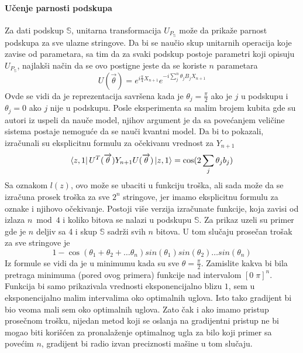 \documentclass[12pt, letterpaper, oneside]{article}
\begin{document}
\paragraph{Učenje parnosti podskupa}
Za dati podskup $\mathbb{S}$, unitarna transformacija $U_{P_\mathbb{S}}$ može da prikaže parnost podskupa za sve ulazne stringove.
Da bi se naučio skup unitarnih operacija koje zavise od parametara, sa tim da za svaki podskup postoje parametri koji opisuju $U_{P_\mathbb{S}}$,
najlakši način da se ovo postigne jeste da se koriste $n$ parametara
\[
    U(\overrightarrow{\theta}) = e^{i\frac{\pi}{4}X_{n+1}}e^{-i\sum_j^n \theta_jB_jX_{n+1}}
\]
Ovde se vidi da je reprezentacija savršena kada je $\theta_j = \frac{\pi}{2}$ ako je $j$ u podskupu i $\theta_j = 0$ ako $j$ nije u podskupu.
Posle eksperimenta sa malim brojem kubita gde su autori iz \cite{Classification_wit_QNN} uspeli da nauče model, njihov argument je da sa povećanjem veličine sistema postaje nemoguće da se nauči kvantni model.
Da bi to pokazali, izračunali su eksplicitnu formulu za očekivanu vrednost za $Y_{n+1}$
\[
    \bra{z,1}U^T(\overrightarrow{\theta})Y_{n+1}U(\overrightarrow{\theta})\Ket{z,1} = \cos(2\sum_j\theta_jb_j)
\]
Sa oznakom $l(z)$, ovo može se ubaciti u funkciju troška, ali sada može da se izračuna prosek
troška za sve $2^n$ stringove, jer imamo eksplicitnu formulu za oznake i njihovo očekivanje.
Postoji više verzija izračunate funkcije, koja zavisi od izlaza $n \bmod 4$ i koliko bitova se nalazi u podskupu $\mathbb{S}$.
Za prikaz uzeli su primer gde je $n$ deljiv sa 4 i skup $\mathbb{S}$ sadrži svih $n$ bitova.
U tom slučaju prosečan trošak za sve stringove je 
\[
    1 - \cos(\theta_1 + \theta_2 + \dots \theta_n)sin(\theta_1)sin(\theta_2) \dots sin(\theta_n)
\]
Iz formule se vidi da je u minimumu kada su sve $\theta=\frac{\pi}{2}$. Zamislite kakva bi bila pretraga minimuma (pored ovog primera) funkcije
nad intervalom $[0\;\pi]^n$. Funkcija bi samo prikazivala vrednosti eksponencijalno blizu $1$, sem u eksponencijalno malim intervalima oko optimalnih uglova.
Isto tako gradijent bi bio veoma mali sem oko optimalnih uglova. Zato čak i ako imamo pristup prosečnom trošku, nijedan metod koji se oslanja na gradijentni pristup
ne bi mogao biti korišćen za pronalaženje optimalnog ugla za bilo koji primer sa povećim $n$, gradijent bi radio izvan preciznosti mašine u tom slučaju.
\end{document}
